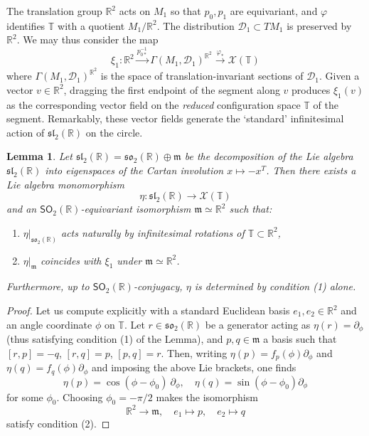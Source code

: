 \documentclass{article}
\def\fsl{\mathfrak{sl}}
\def\fso{\mathfrak{so}}
\def\fm{\mathfrak{m}}
\def\sD{\mathcal{D}}
\def\RR{\mathbb{R}}
\def\TT{\mathbb{T}}
\def\XX{\mathcal{X}}
\def\SO{\mathsf{SO}}
\newtheorem{lem}{Lemma}
\theoremstyle{definition}
\begin{document}
The translation group $\RR^2$
acts on $M_1$ so that $p_0,p_1$ are equivariant,
and $\varphi$ identifies $\TT$ with a quotient $M_1/\RR^2$.
The distribution $\sD_1 \subset TM_1$ is preserved by $\RR^2$.
We may thus consider the map
\begin{equation}
        \label{eq:xi1}
        \xi_1 : \RR^2 \xrightarrow{ p_{0*}^{-1}}  \Gamma(M_1,\sD_1)^{\RR^2} \xrightarrow{\varphi_*} \XX(\TT) 
\end{equation}
where $\Gamma(M_1,\sD_1)^{\RR^2}$ is the space of translation-invariant sections of $\sD_1$.
Given a vector $v \in \RR^2$, dragging the first endpoint
of the segment along $v$ produces $\xi_1(v)$ as the corresponding
vector field on the \emph{reduced} configuration space $\TT$ of the segment.
Remarkably, these vector fields generate the `standard' infinitesimal action of $\fsl_2(\RR)$
on the circle.
\begin{lem}
        Let $\fsl_2(\RR) = \fso_2(\RR) \oplus \fm$ be the decomposition
        of the Lie algebra $\fsl_2(\RR)$ into eigenspaces of the Cartan
        involution $x\mapsto-x^T$. Then there exists a Lie algebra monomorphism
        $$ \eta : \fsl_2(\RR) \to \XX(\TT) $$
        and an $\SO_2(\RR)$-equivariant isomorphism $\fm\simeq\RR^2$
        such that:
        \begin{enumerate}
                \item $\eta|_{\fso_2(\RR)}$ acts naturally by infinitesimal rotations of $\TT\subset \RR^2$,
                \item $\eta|_\fm$ coincides with $\xi_1$ under $\fm\simeq\RR^2$.
        \end{enumerate}
        Furthermore, up to $\SO_2(\RR)$-conjugacy, $\eta$ is determined by condition (1) alone.
\end{lem}
\begin{proof}
        Let us compute explicitly with a standard Euclidean basis $e_1,e_2 \in \RR^2$
        and an angle coordinate $\phi$ on $\TT$. Let $r \in \fso_2(\RR)$ be a generator
        acting as $\eta(r)=\partial_\phi$ (thus satisfying condition (1) of the Lemma), 
        and $p,q \in \fm$ a basis such that
        $[r,p]=-q$, $[r,q]=p$, $[p,q]=r$.
        Then, writing $\eta(p) = f_p(\phi)\partial_\phi$ and $\eta(q) = f_q(\phi)\partial_\phi$ and
        imposing the above Lie brackets,
        one finds 
        $$ \eta(p) = \cos(\phi-\phi_0)\ \partial_\phi,\quad \eta(q) = \sin(\phi-\phi_0)\partial_\phi $$
        for some $\phi_0$. Choosing $\phi_0=-\pi/2$ makes the isomorphism
        $$ \RR^2 \to \fm,\quad e_1 \mapsto p,\quad e_2\mapsto q $$
        satisfy condition (2).
\end{proof}
\end{document}
